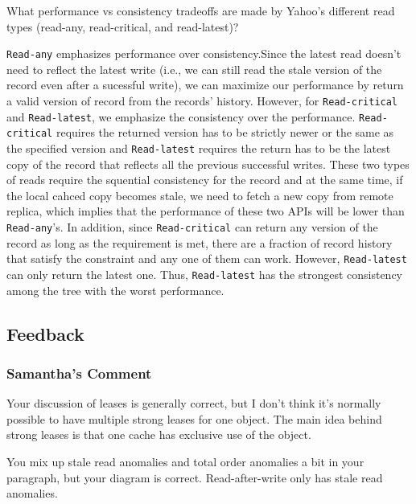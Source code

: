 \begin{QandA}
   \item What performance vs consistency tradeoffs are made by Yahoo's different read types (read-any, read-critical, and read-latest)?
         \begin{answered}
    	 \texttt{Read-any} emphasizes performance over consistency.Since the latest read doesn't need to reflect the latest write (i.e.,
    	 we can still read the stale version of the record even after a sucessful write), we can maximize our performance by return a valid
    	 version of record from the records' history. However, for \texttt{Read-critical} and \texttt{Read-latest}, we emphasize the consistency
    	 over the performance. \texttt{Read-critical} requires the returned version has to be strictly newer or the same as the specified version
    	 and \texttt{Read-latest} requires the return has to be the latest copy of the record that reflects all the previous successful writes.
    	 These two types of reads require the squential consistency for the record and at the same time, if the local cahced copy becomes stale,
    	 we need to fetch a new copy from remote replica, which implies that the performance of these two APIs will be lower than \texttt{Read-any}'s. In addition, since \texttt{Read-critical} can return any version of the record as long as the requirement is met, there
    	 are a fraction of record history that satisfy the constraint and any one of them can work. However, \texttt{Read-latest} can only return
    	 the latest one. Thus, \texttt{Read-latest} has the strongest consistency among the tree with the worst performance.
         \end{answered}
\end{QandA}

\subsection{Feedback}

\subsubsection{Samantha's Comment}
Your discussion of leases is generally correct, but I don't think it's normally possible to have multiple strong leases for one object. The main idea behind strong leases is that one cache has exclusive use of the object.

You mix up stale read anomalies and total order anomalies a bit in your paragraph, but your diagram is correct. Read-after-write only has stale read anomalies.


